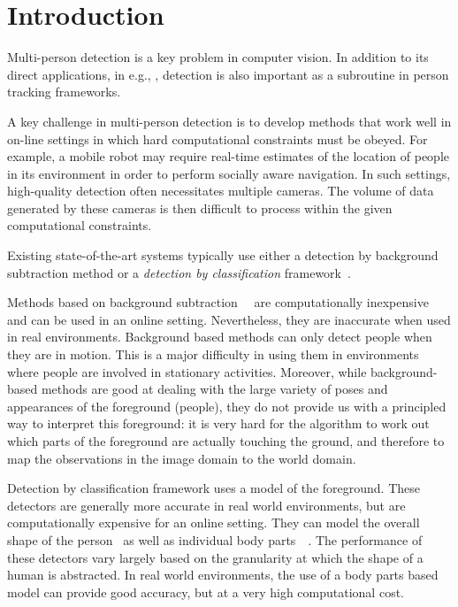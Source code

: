 \documentclass[10pt,twocolumn,letterpaper]{article}
\begin{document}
\section{Introduction}
Multi-person detection is a key problem in computer vision.  In addition to its direct applications, in e.g., , detection is also important as a subroutine in person tracking  frameworks.  

A key challenge in multi-person detection is to develop methods that work well in on-line settings in which hard computational constraints must be obeyed. For example, a mobile robot may require real-time  estimates of the location of people in its environment in order to perform socially aware navigation.  In such settings, high-quality detection often necessitates multiple cameras.  The volume of data generated by these cameras is then difficult to process within the given computational constraints.  

Existing state-of-the-art systems typically use either a  detection by background subtraction method or a \emph{detection by classification} framework~\cite{Pami-11}.

Methods based on background subtraction~\cite{bk1}~\cite{bk2-bayesian} are computationally inexpensive and can be used in an online setting. Nevertheless, they are inaccurate when used in real environments. Background based methods can only detect people when they are in motion. This is a major difficulty in using them in environments where people are involved in stationary activities. Moreover, while background-based methods are good at dealing with the large variety of poses and appearances of the foreground (people), they do not provide us with a principled way to interpret this foreground: it is very hard for the algorithm to work out which parts of the foreground are actually touching the ground, and therefore to map the observations in the image domain to the world domain.

Detection by classification framework uses a model of the foreground. These detectors are generally more accurate in real world environments, but are computationally expensive for an online setting. They can model the overall shape of the person~\cite{dalaltriggs} as well as individual body parts~\cite{DPM}~\cite{partsDeva}. The performance of these detectors vary largely based on the granularity at which the shape of a human is abstracted. In real world environments, the use of a body parts based model can provide good accuracy, but at a very high computational cost.
\end{document}
